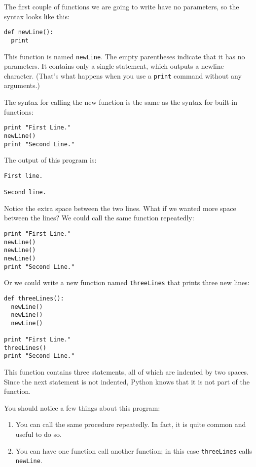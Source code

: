 The first couple of functions we are going to write have no parameters,
so the syntax looks like this:

\beforeverb
\begin{verbatim}
def newLine():
  print
\end{verbatim}
\afterverb
%
This function is named {\tt newLine}.  The empty parentheses indicate
that it has no parameters.  It contains only a single statement, which
outputs a newline character. (That's what happens when you use a {\tt print}
command without any arguments.)

The syntax for calling the new function is the same as the syntax
for built-in functions:

\beforeverb
\begin{verbatim}
print "First Line."
newLine()
print "Second Line."
\end{verbatim}
\afterverb
%
The output of this program is:

\beforeverb
\begin{verbatim}
First line.

Second line.
\end{verbatim}
\afterverb
%
Notice the extra space between the two lines.  What if we wanted
more space between the lines?  We could call the same function
repeatedly:

\beforeverb
\begin{verbatim}
print "First Line."
newLine()
newLine()
newLine()
print "Second Line."
\end{verbatim}
\afterverb
%
Or we could write a new function named {\tt threeLines} that prints
three new lines:

\beforeverb
\begin{verbatim}
def threeLines():
  newLine()
  newLine()
  newLine()

print "First Line."
threeLines()
print "Second Line."
\end{verbatim}
\afterverb
%
This function contains three statements, all of which are indented by two
spaces.  Since the next statement is not indented, Python knows that it is
not part of the function.

You should notice a few things about this program:

\begin{enumerate}

\item You can call the same procedure repeatedly.  In fact, it is quite common
and useful to do so.

\item You can have one function call another function; in this case
{\tt threeLines} calls {\tt newLine}.

\end{enumerate}

